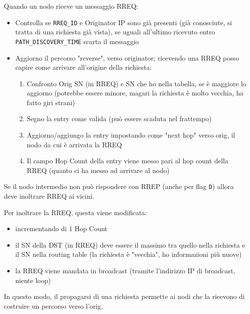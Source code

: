 Quando un nodo riceve un messaggio RREQ:
\begin{itemize}
	\item Controlla se \texttt{RREQ\_ID} e Originator IP sono già presenti (già conosciute, si tratta di una richiesta già vista), se uguali all'ultimo ricevuto entro \texttt{PATH\_DISCOVERY\_TIME} scarta il messaggio
    
	\item Aggiorno il percorso "reverse", verso originator; ricevendo una RREQ posso capire come arrivare all'origine della richiesta:
	\begin{enumerate}
		\item Confronto Orig SN (in RREQ) e SN che ho nella tabella, se è maggiore lo aggiorno (potrebbe essere minore, magari la richiesta è molto vecchia, ha fatto giri strani)
		
        \item Segno la entry come valida (può essere scaduta nel frattempo)
		
        \item Aggiorno/aggiungo la entry impostando come "next hop" verso orig, il nodo da cui è arrivata la RREQ
		
        \item Il campo Hop Count della entry viene messo pari al hop count della RREQ (quanto ci ha messo ad arrivare al nodo)
	\end{enumerate}
\end{itemize}


Se il nodo intermedio non può rispondere con RREP (anche per flag \texttt{D}) allora deve inoltrare RREQ ai vicini. 

Per inoltrare la RREQ, questa viene modificata:
\begin{itemize}
	\item incrementando di 1 Hop Count
    
	\item il SN della DST (in RREQ) deve essere il massimo tra quello nella richiesta e il SN nella routing table (la richiesta è "vecchia", ho informazioni più nuove)
    
	\item la RREQ viene mandata in broadcast (tramite l'indirizzo IP di broadcast, niente loop)
\end{itemize}

In questo modo, il propagarsi di una richiesta permette ai nodi che la ricevono di costruire un percorso verso l'orig.


